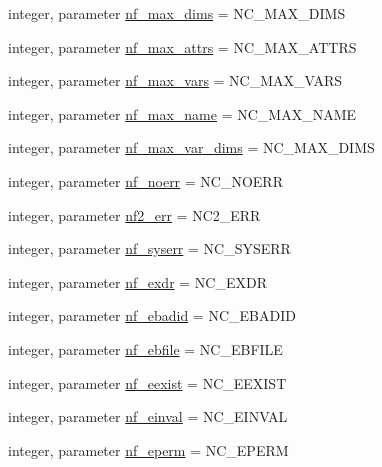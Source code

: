 \begin{DoxyCompactItemize}
integer, parameter \hyperlink{namespacenetcdf__nf__data_a62dee4845e079e42d75d85764480a527}{nf\+\_\+max\+\_\+dims} = N\+C\+\_\+\+M\+A\+X\+\_\+\+D\+I\+MS
\item 
integer, parameter \hyperlink{namespacenetcdf__nf__data_a3f6563baafe2dee829da95ebee9cce4f}{nf\+\_\+max\+\_\+attrs} = N\+C\+\_\+\+M\+A\+X\+\_\+\+A\+T\+T\+RS
\item 
integer, parameter \hyperlink{namespacenetcdf__nf__data_a9fd743aeebaed691ce9dbfa0313c1dac}{nf\+\_\+max\+\_\+vars} = N\+C\+\_\+\+M\+A\+X\+\_\+\+V\+A\+RS
\item 
integer, parameter \hyperlink{namespacenetcdf__nf__data_aa18f154c8912d6353abc73ac7e69545a}{nf\+\_\+max\+\_\+name} = N\+C\+\_\+\+M\+A\+X\+\_\+\+N\+A\+ME
\item 
integer, parameter \hyperlink{namespacenetcdf__nf__data_ae2feef7fecd896c04caea95954896648}{nf\+\_\+max\+\_\+var\+\_\+dims} = N\+C\+\_\+\+M\+A\+X\+\_\+\+D\+I\+MS
\item 
integer, parameter \hyperlink{namespacenetcdf__nf__data_a4ecd2f28d20446daf2b7b3f4f8122a34}{nf\+\_\+noerr} = N\+C\+\_\+\+N\+O\+E\+RR
\item 
integer, parameter \hyperlink{namespacenetcdf__nf__data_a584209e7c8aad290efa2f2ade190414d}{nf2\+\_\+err} = N\+C2\+\_\+\+E\+RR
\item 
integer, parameter \hyperlink{namespacenetcdf__nf__data_afcbee7a5a51e76aefb4df1c2517a331b}{nf\+\_\+syserr} = N\+C\+\_\+\+S\+Y\+S\+E\+RR
\item 
integer, parameter \hyperlink{namespacenetcdf__nf__data_a8e8ca93d019190a92a16be656ca4b82d}{nf\+\_\+exdr} = N\+C\+\_\+\+E\+X\+DR
\item 
integer, parameter \hyperlink{namespacenetcdf__nf__data_a4203e361f8b881939c4c46d159e1b53e}{nf\+\_\+ebadid} = N\+C\+\_\+\+E\+B\+A\+D\+ID
\item 
integer, parameter \hyperlink{namespacenetcdf__nf__data_a00bf57710d47fba9afbfe51ce91e36a1}{nf\+\_\+ebfile} = N\+C\+\_\+\+E\+B\+F\+I\+LE
\item 
integer, parameter \hyperlink{namespacenetcdf__nf__data_adf41aab468851d0834f57f4e3005905d}{nf\+\_\+eexist} = N\+C\+\_\+\+E\+E\+X\+I\+ST
\item 
integer, parameter \hyperlink{namespacenetcdf__nf__data_a8da93d02620d2bcb4100bfd8bf86c552}{nf\+\_\+einval} = N\+C\+\_\+\+E\+I\+N\+V\+AL
\item 
integer, parameter \hyperlink{namespacenetcdf__nf__data_ab7837c92cf78856dde1888b059c4272c}{nf\+\_\+eperm} = N\+C\+\_\+\+E\+P\+E\+RM
\item 

\end{DoxyCompactItemize}

